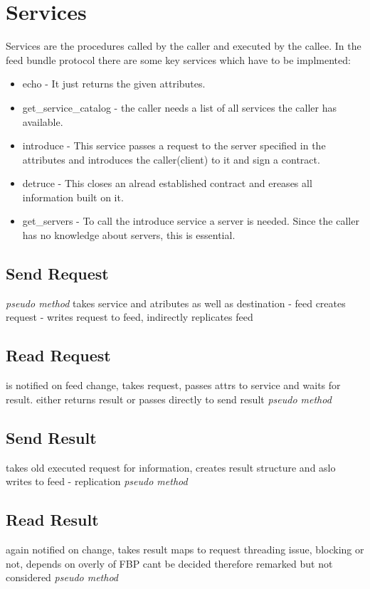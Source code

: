 \section{Services}
Services are the procedures called by the caller and executed by the callee. In the feed bundle protocol there are some key services which have to be implmented:
\begin{itemize}
    \item echo - It just returns the given attributes.
    \item get\_service\_catalog - the caller needs a list of all services the caller has available.
    \item introduce - This service passes a request to the server specified in the attributes and introduces the caller(client) to it and sign a contract.
    \item detruce - This closes an alread established contract and ereases all information built on it.
    \item get\_servers - To call the introduce service a server is needed. Since the caller has no knowledge about servers, this is essential.
\end{itemize}
\subsection{Send Request}
\textit{pseudo method}
takes service and atributes as well as destination - feed creates request - writes request to feed, indirectly replicates feed
\subsection{Read Request}
is notified on feed change, takes request, passes attrs to service and waits for result. either returns result or passes directly to send result
\textit{pseudo method}
\subsection{Send Result}
takes old executed request for information, creates result structure and aslo writes to feed - replication
\textit{pseudo method}
\subsection{Read Result}
again notified on change, takes result maps to request threading issue, blocking or not, depends on overly of FBP cant be decided therefore remarked but not considered
\textit{pseudo method}

